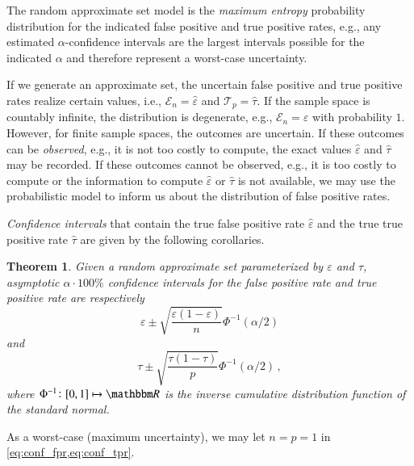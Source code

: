 \documentclass[10pt,final,hidelinks]{article}
\numberwithin{equation}{section}
\DeclarePairedDelimiter\Card{\lvert}{\rvert}
\newcommand{\RealSet}{\BlackboardSet{R}}
\newcommand{\FPR}{\mathcal{E}}
\newcommand{\TPR}{\mathcal{T}}
\newcommand{\tprate}{\tau}
\newcommand{\fprate}{\varepsilon}
\newcommand{\fprateob}{\hat{\fprate}}
\newcommand{\tprateob}{\hat{\tprate}}
\newcommand{\envnumstyle}{chapter}
\renewcommand{\envnumstyle}{chapter}
\renewcommand{\envnumstyle}{section}
\theoremstyle{plain}
\newtheorem{theorem}{Theorem}[\envnumstyle]
\begin{document}
The random approximate set model is the \emph{maximum entropy} probability distribution for the indicated false positive and true positive rates, e.g., any estimated $\alpha$-confidence intervals are the largest intervals possible for the indicated $\alpha$ and therefore represent a worst-case uncertainty.

If we generate an approximate set, the uncertain false positive and true positive rates realize certain values, i.e., $\FPR_n = \fprateob$ and $\TPR_p = \tprateob$.
If the sample space is countably infinite, the distribution is degenerate, e.g., $\FPR_n = \fprate$ with probability $1$. 
However, for finite sample spaces, the outcomes are uncertain.
If these outcomes can be \emph{observed}, e.g., it is not too costly to compute, the exact values $\fprateob$ and $\tprateob$ may be recorded.
If these outcomes cannot be observed, e.g., it is too costly to compute or the information to compute $\fprateob$ or $\tprateob$ is not available, we may use the probabilistic model to inform us about the distribution of false positive rates.

\emph{Confidence intervals} that contain the true false positive rate $\fprateob$ and the true true positive rate $\tprateob$ are given by the following corollaries.
\begin{theorem}
    Given a random approximate set parameterized by $\fprate$ and $\tprate$, asymptotic $\alpha \cdot 100\%$ confidence intervals for the false positive rate and true positive rate are respectively
    \begin{equation}
    \label{eq:conf_fpr}
    \fprate \pm \sqrt{\frac{\fprate(1-\fprate)}{n}} \Phi^{-1}(\alpha/2)
    \end{equation}
    and
    \begin{equation}
    \label{eq:conf_tpr}
    \tprate \pm \sqrt{\frac{\tprate(1-\tprate)}{p}} \Phi^{-1}(\alpha/2)\,,
    \end{equation}
    where $\Phi^{-1} \colon [0,1] \mapsto \RealSet$ is the inverse cumulative distribution function of the standard normal.
\end{theorem}
As a worst-case (maximum uncertainty), we may let $n = p = 1$ in \cref{eq:conf_fpr,eq:conf_tpr}.
\end{document}
